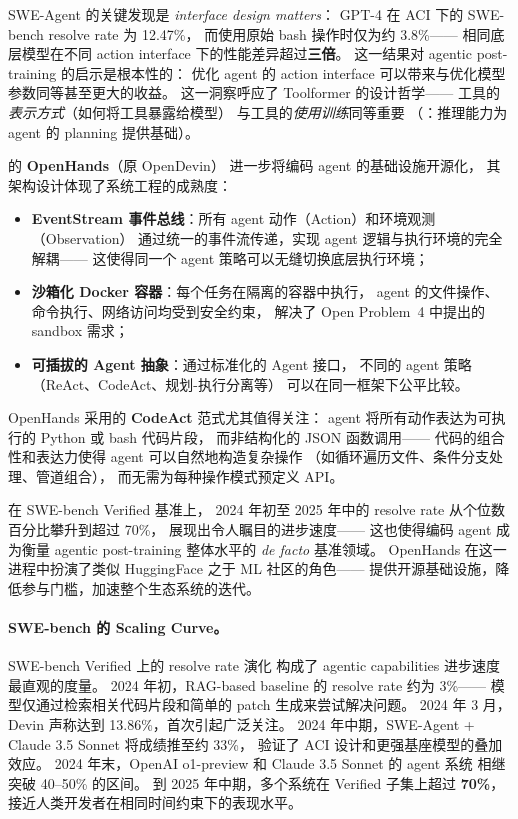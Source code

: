 SWE-Agent 的关键发现是 \emph{interface design matters}：
GPT-4 在 ACI 下的 SWE-bench resolve rate 为 12.47\%，
而使用原始 bash 操作时仅为约 3.8\%——
相同底层模型在不同 action interface 下的性能差异超过\textbf{三倍}。
这一结果对 agentic post-training 的启示是根本性的：
优化 agent 的 action interface 可以带来与优化模型参数同等甚至更大的收益。
这一洞察呼应了 Toolformer 的设计哲学——
工具的\emph{表示方式}（如何将工具暴露给模型）
与工具的\emph{使用训练}同等重要
（：推理能力为 agent 的 planning 提供基础）。

\citet{wang2024opendevin} 的 \textbf{OpenHands}（原 OpenDevin）
进一步将编码 agent 的基础设施开源化，
其架构设计体现了系统工程的成熟度：
\begin{itemize}[leftmargin=*]
  \item \textbf{EventStream 事件总线}：所有 agent 动作（Action）和环境观测（Observation）
    通过统一的事件流传递，实现 agent 逻辑与执行环境的完全解耦——
    这使得同一个 agent 策略可以无缝切换底层执行环境；
  \item \textbf{沙箱化 Docker 容器}：每个任务在隔离的容器中执行，
    agent 的文件操作、命令执行、网络访问均受到安全约束，
    解决了 Open Problem~4 中提出的 sandbox 需求；
  \item \textbf{可插拔的 Agent 抽象}：通过标准化的 Agent 接口，
    不同的 agent 策略（ReAct、CodeAct、规划-执行分离等）
    可以在同一框架下公平比较。
\end{itemize}
OpenHands 采用的 \textbf{CodeAct} 范式尤其值得关注：
agent 将所有动作表达为可执行的 Python 或 bash 代码片段，
而非结构化的 JSON 函数调用——
代码的组合性和表达力使得 agent 可以自然地构造复杂操作
（如循环遍历文件、条件分支处理、管道组合），
而无需为每种操作模式预定义 API。

在 SWE-bench Verified 基准上，
2024 年初至 2025 年中的 resolve rate
从个位数百分比攀升到超过 70\%，
展现出令人瞩目的进步速度——
这也使得编码 agent 成为衡量 agentic post-training 整体水平的
\emph{de facto} 基准领域。
OpenHands 在这一进程中扮演了类似 HuggingFace 之于 ML 社区的角色——
提供开源基础设施，降低参与门槛，加速整个生态系统的迭代。

\paragraph{SWE-bench 的 Scaling Curve。}
SWE-bench Verified 上的 resolve rate 演化
构成了 agentic capabilities 进步速度最直观的度量。
2024 年初，RAG-based baseline 的 resolve rate 约为 3\%——
模型仅通过检索相关代码片段和简单的 patch 生成来尝试解决问题。
2024 年 3 月，Devin 声称达到 13.86\%，首次引起广泛关注。
2024 年中期，SWE-Agent + Claude 3.5 Sonnet 将成绩推至约 33\%，
验证了 ACI 设计和更强基座模型的叠加效应。
2024 年末，OpenAI o1-preview 和 Claude 3.5 Sonnet 的 agent 系统
相继突破 40--50\% 的区间。
到 2025 年中期，多个系统在 Verified 子集上超过 \textbf{70\%}，
接近人类开发者在相同时间约束下的表现水平。


